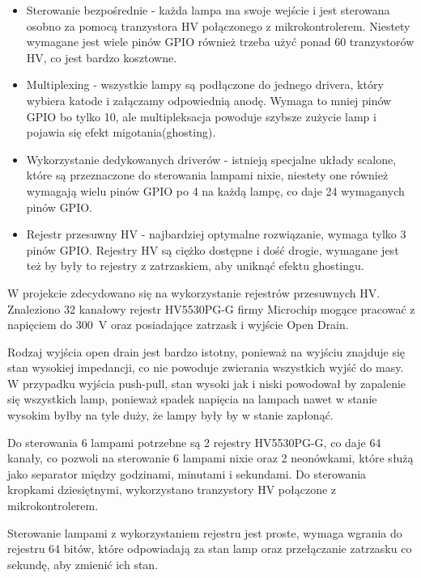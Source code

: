 \documentclass[../main.tex]{subfiles}
\begin{document}
\begin{itemize}
    \item Sterowanie bezpośrednie - każda lampa ma swoje wejście i jest sterowana osobno za pomocą tranzystora HV połączonego z mikrokontrolerem.
    Niestety wymagane jest wiele pinów GPIO również trzeba użyć ponad 60 tranzystorów HV, co jest bardzo kosztowne.
    \item Multiplexing - wszystkie lampy są podłączone do jednego drivera, który wybiera katode i załączamy odpowiednią anodę. 
    Wymaga to mniej pinów GPIO bo tylko 10, ale multipleksacja powoduje szybsze zużycie lamp i pojawia się efekt migotania(ghosting).
    \item Wykorzystanie dedykowanych driverów - istnieją specjalne układy scalone, które są przeznaczone do sterowania lampami nixie, niestety
    one również wymagają wielu pinów GPIO po 4 na każdą lampę, co daje 24 wymaganych pinów GPIO.
    \item Rejestr przesuwny HV - najbardziej optymalne rozwiązanie, wymaga tylko 3 pinów GPIO. Rejestry HV są ciężko dostępne i dość drogie,
    wymagane jest też by były to rejestry z zatrzaskiem, aby uniknąć efektu ghostingu.
\end{itemize}

W projekcie zdecydowano się na wykorzystanie rejestrów przesuwnych HV. Znaleziono 32 kanałowy rejestr 
HV5530PG-G firmy Microchip mogące pracować z napięciem do \SI{300}{\volt} oraz posiadające zatrzask i wyjście Open Drain.

Rodzaj wyjścia open drain jest bardzo istotny, ponieważ na wyjściu znajduje się stan wysokiej impedancji, co nie powoduje zwierania wszystkich wyjść do masy.
W przypadku wyjścia push-pull, stan wysoki jak i niski powodował by zapalenie się wszystkich lamp, ponieważ spadek napięcia na lampach
nawet w stanie wysokim byłby na tyle duży, że lampy były by w stanie zapłonąć.

Do sterowania 6 lampami potrzebne są 2 rejestry HV5530PG-G, co daje 64 kanały, co pozwoli na sterowanie 6 lampami nixie oraz 2 neonówkami, które
służą jako separator między godzinami, minutami i sekundami. Do sterowania kropkami dziesiętnymi, wykorzystano tranzystory HV połączone z mikrokontrolerem.

Sterowanie lampami z wykorzystaniem rejestru jest proste, wymaga wgrania do rejestru 64 bitów, które odpowiadają za stan lamp oraz przełączanie
zatrzasku co sekundę, aby zmienić ich stan.

\end{document}
